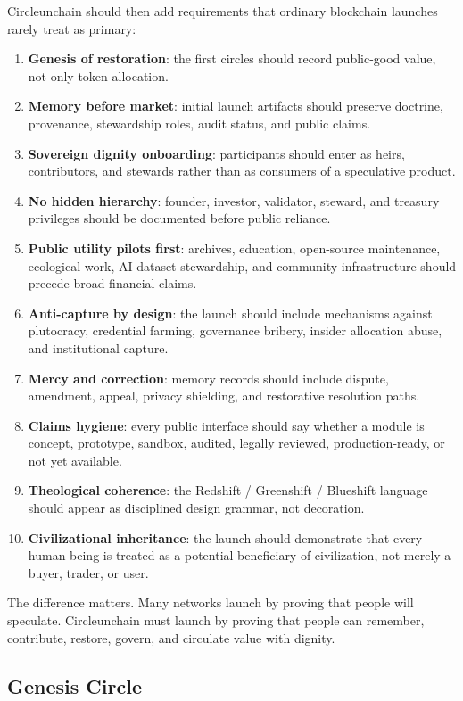 \documentclass[12pt]{article}
\begin{document}
Circleunchain should then add requirements that ordinary blockchain launches rarely treat as primary:

\begin{enumerate}
  \item \textbf{Genesis of restoration}: the first circles should record public-good value, not only token allocation.
  \item \textbf{Memory before market}: initial launch artifacts should preserve doctrine, provenance, stewardship roles, audit status, and public claims.
  \item \textbf{Sovereign dignity onboarding}: participants should enter as heirs, contributors, and stewards rather than as consumers of a speculative product.
  \item \textbf{No hidden hierarchy}: founder, investor, validator, steward, and treasury privileges should be documented before public reliance.
  \item \textbf{Public utility pilots first}: archives, education, open-source maintenance, ecological work, AI dataset stewardship, and community infrastructure should precede broad financial claims.
  \item \textbf{Anti-capture by design}: the launch should include mechanisms against plutocracy, credential farming, governance bribery, insider allocation abuse, and institutional capture.
  \item \textbf{Mercy and correction}: memory records should include dispute, amendment, appeal, privacy shielding, and restorative resolution paths.
  \item \textbf{Claims hygiene}: every public interface should say whether a module is concept, prototype, sandbox, audited, legally reviewed, production-ready, or not yet available.
  \item \textbf{Theological coherence}: the Redshift / Greenshift / Blueshift language should appear as disciplined design grammar, not decoration.
  \item \textbf{Civilizational inheritance}: the launch should demonstrate that every human being is treated as a potential beneficiary of civilization, not merely a buyer, trader, or user.
\end{enumerate}

The difference matters. Many networks launch by proving that people will speculate. Circleunchain must launch by proving that people can remember, contribute, restore, govern, and circulate value with dignity.

\subsection{Genesis Circle}
\end{document}

